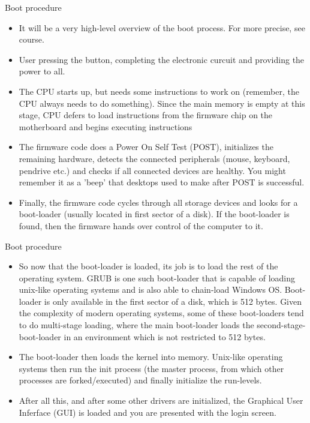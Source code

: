 \documentclass[usenames,dvipsnames,10pt,aspectratio=169]{beamer}
\begin{document}
\begin{frame}{Boot procedure}
    \begin{itemize}
        \item It will be a very high-level overview of the boot process. For more precise, see  course.
        \item User pressing the button, completing the electronic curcuit and providing the power to all.
        \item The CPU starts up, but needs some instructions to work on (remember, the CPU always needs to do something). Since the main memory is empty at this stage, CPU defers to load instructions from the firmware chip on the motherboard and begins executing instructions
        \item The firmware code does a Power On Self Test (POST), initializes the remaining hardware, detects the connected peripherals (mouse, keyboard, pendrive etc.) and checks if all connected devices are healthy. You might remember it as a 'beep' that desktops used to make after POST is successful.
        \item Finally, the firmware code cycles through all storage devices and looks for a boot-loader (usually located in first sector of a disk). If the boot-loader is found, then the firmware hands over control of the computer to it.
    \end{itemize}
\end{frame}

\begin{frame}{Boot procedure}
    \begin{itemize}
        \item So now that the boot-loader is loaded, its job is to load the rest of the operating system. GRUB is one such boot-loader that is capable of loading unix-like operating systems and is also able to chain-load Windows OS. Boot-loader is only available in the first sector of a disk, which is 512 bytes. Given the complexity of modern operating systems, some of these boot-loaders tend to do multi-stage loading, where the main boot-loader loads the second-stage-boot-loader in an environment which is not restricted to 512 bytes.
        \item The boot-loader then loads the kernel into memory. Unix-like operating systems then run the init process (the master process, from which other processes are forked/executed) and finally initialize the run-levels.
        \item After all this, and after some other drivers are initialized, the Graphical User Inferface (GUI) is loaded and you are presented with the login screen.
    \end{itemize}
\end{frame}
\end{document}
